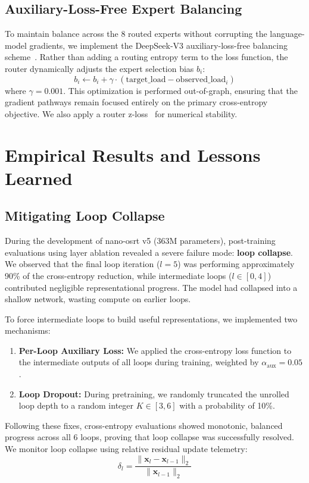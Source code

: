 \documentclass[11pt,twocolumn]{article}
\begin{document}
\subsection{Auxiliary-Loss-Free Expert Balancing}
To maintain balance across the 8 routed experts without corrupting the language-model gradients, we implement the DeepSeek-V3 auxiliary-loss-free balancing scheme~\cite{wang2024,han2025}. Rather than adding a routing entropy term to the loss function, the router dynamically adjusts the expert selection bias $b_i$:
\begin{equation}
b_i \leftarrow b_i + \gamma \cdot (\text{target\_load} - \text{observed\_load}_i)
\end{equation}
where $\gamma = 0.001$. This optimization is performed out-of-graph, ensuring that the gradient pathways remain focused entirely on the primary cross-entropy objective. We also apply a router z-loss~\cite{stmoe2022} for numerical stability.

\section{Empirical Results and Lessons Learned}

\subsection{Mitigating Loop Collapse}
\label{sec:aux-heads}
During the development of nano-osrt v5 (363M parameters), post-training evaluations using layer ablation revealed a severe failure mode: \textbf{loop collapse}. We observed that the final loop iteration ($l=5$) was performing approximately 90\% of the cross-entropy reduction, while intermediate loops ($l \in [0, 4]$) contributed negligible representational progress. The model had collapsed into a shallow network, wasting compute on earlier loops.

To force intermediate loops to build useful representations, we implemented two mechanisms:
\begin{enumerate}
    \item \textbf{Per-Loop Auxiliary Loss:} We applied the cross-entropy loss function to the intermediate outputs of all loops during training, weighted by $\alpha_{\text{aux}} = 0.05$.
    \item \textbf{Loop Dropout:} During pretraining, we randomly truncated the unrolled loop depth to a random integer $K \in [3, 6]$ with a probability of 10\%.
\end{enumerate}
Following these fixes, cross-entropy evaluations showed monotonic, balanced progress across all 6 loops, proving that loop collapse was successfully resolved. We monitor loop collapse using relative residual update telemetry:
\begin{equation}
\delta_l = \frac{\|\mathbf{x}_l - \mathbf{x}_{l-1}\|_2}{\|\mathbf{x}_{l-1}\|_2}
\end{equation}
\end{document}
